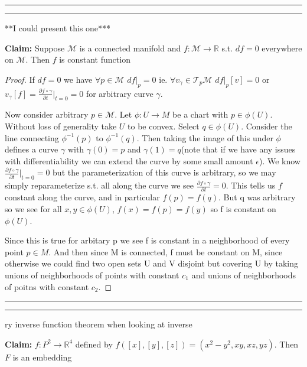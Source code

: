 \documentclass[11pt]{article}
\newcommand{\R}{\mathbb{R}}
\newcommand{\m}{\mathcal{M}}
\newcommand{\Tt}{\mathcal{T}}
\newcommand{\pa}{\partial}
\newcommand{\question}[2] {\vspace{.25in} \hrule\vspace{0.5em}
\noindent{\bf #1: #2} \vspace{0.5em}
\hrule \vspace{.10in}}
\begin{document}
\question{Question 4}

***I could present this one***

\textbf{Claim:} Suppose $\m$ is a connected manifold and $f : \m \to \R$ s.t. $df = 0$ everywhere on $\m$. Then $f$ is constant function

\begin{proof}

If $df = 0$ we have $\forall p \in \m$ $df|_p = 0$ ie. $\forall v_{\gamma} \in \Tt_p \m$ $df|_p [v] = 0$ or $v_{\gamma}[f] = \frac{\pa f \circ \gamma}{\pa t}|_{t=0} = 0$ for arbitrary curve $\gamma$. 


Now consider arbitrary $p \in \m$. Let $\phi : U \to M$ be a chart with $p \in \phi(U)$. Without loss of generality take $U$ to be convex. Select $q \in \phi(U)$. Consider the line connecting $\phi^{-1}(p)$ to $\phi^{-1}(q)$. Then taking the image of this under $\phi$ defines a curve $\gamma$ with $\gamma(0)=p$ and $\gamma(1) =q$(note that if we have any issues with differentiability we can extend the curve by some small amount $\epsilon$). We know $\frac{\pa f \circ \gamma}{\pa t}|_{t=0} = 0$ but the parameterization of this curve is arbitrary, so we may simply reparameterize s.t. all along the curve we see $\frac{\pa f \circ \gamma}{\pa t} = 0$. This tells us $f$ constant along the curve, and in particular $f(p) = f(q)$. But q was arbitrary so we see for all $x,y \in \phi(U)$, $f(x) = f(p) = f(y)$ so f is constant on $\phi(U)$. 

Since this is true for arbitary p we see f is constant in a neighborhood of every point $p \in M$. And then since M is connected, f must be constant on M, since otherwise we could find two open sets U and V disjoint but covering U by taking unions of neighborhoods of points with constant $c_1$ and unions of neighborhoods of poitns with constant $c_2$. 


\end{proof}

\question{Question 5}

Try inverse function theorem when looking at inverse

\textbf{Claim:} $f: P^2 \to \R^4$ defined by $f([x],[y],[z]) = (x^2-y^2,xy,xz,yz)$. Then $F$ is an embedding
\end{document}
